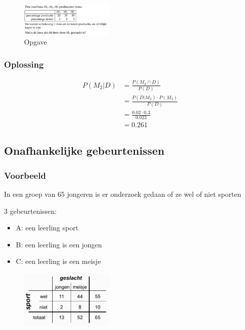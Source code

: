 \documentclass{article}
\begin{document}
\begin{figure}[H]
    \centering
    \includegraphics[width=0.4\textwidth]{voorwaardelijke-kans-oef2.png}
    \caption{Opgave}
\end{figure}

\subsubsection{Oplossing}

\begin{center}
    \begin{align*}
        P(M_2 | D) & = \frac{P(M_2 \cap D)}{P(D)}\\
        & = \frac{P(D | M_2) \cdot P(M_2)}{P(D)}\\
        & = \frac{0.02 \cdot 0.3}{0.023}\\
        & = 0.261
    \end{align*}
\end{center}

\subsection{Onafhankelijke gebeurtenissen}

\subsubsection{Voorbeeld}

In een groep van 65 jongeren is er onderzoek gedaan of ze wel of niet sporten

3 gebeurtenissen:

\begin{itemize}
    \item A: een leerling sport
    \item B: een leerling is een jongen
    \item C: een leerling is een meisje
\end{itemize}

\begin{figure}[H]
    \centering
    \includegraphics[width=0.4\textwidth]{voorwaardelijke-kans-sport2.png}
\end{figure}
\end{document}
